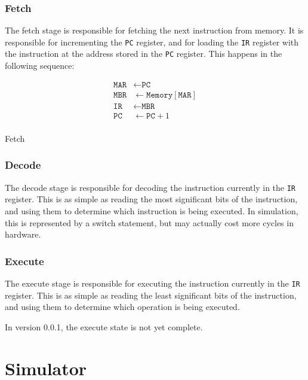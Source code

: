 \documentclass[a4paper,11pt]{article}
\makeatletter
\newenvironment{figurehere}
  {\def\@captype{figure}}
  {}
\makeatother
\begin{document}
\subsubsection{Fetch}
\label{subsubsec:Fetch}

The fetch stage is responsible for fetching the next instruction from memory. It is responsible for incrementing the \texttt{PC} register, and for loading the \texttt{IR} register with the instruction at the address stored in the \texttt{PC} register. This happens in the following sequence:

\begin{figurehere}
  \centering
  $$
    \begin{array}{ll}
      \texttt{MAR} & \gets \texttt{PC}                   \\
      \texttt{MBR} & \gets \texttt{Memory}[\texttt{MAR}] \\
      \texttt{IR}  & \gets \texttt{MBR}                  \\
      \texttt{PC}  & \gets \texttt{PC} + 1               \\
    \end{array}
  $$
  \caption{Fetch}
  \label{fig:Fetch}
\end{figurehere}

\subsubsection{Decode}
\label{subsubsec:Decode}

The decode stage is responsible for decoding the instruction currently in the \texttt{IR} register. This is as simple as reading the most significant bits of the instruction, and using them to determine which instruction is being executed. In simulation, this is represented by a switch statement, but may actually cost more cycles in hardware.

\subsubsection{Execute}
\label{subsubsec:Execute}

The execute stage is responsible for executing the instruction currently in the \texttt{IR} register. This is as simple as reading the least significant bits of the instruction, and using them to determine which operation is being executed.

In version 0.0.1, the execute state is not yet complete.


\section{Simulator}
\label{sec:Simulator}
\end{document}
